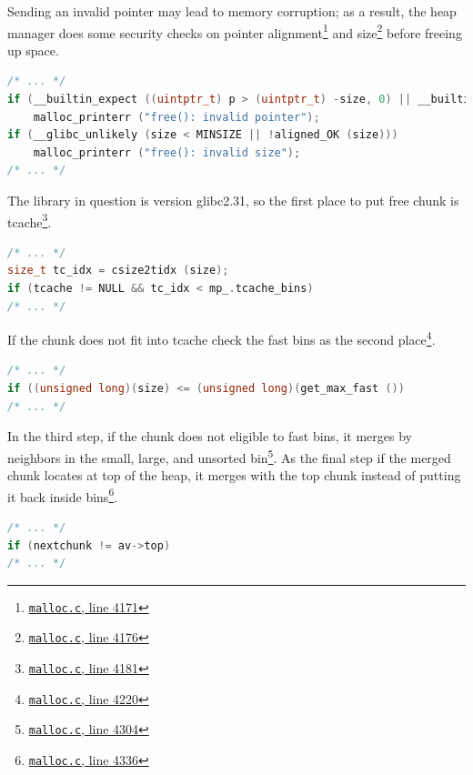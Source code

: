 \documentclass{masterthesis}
\newcommand*\libc{glibc}
\newcommand*\tch{tcache}
\newcommand*\fb{fast bins}
\begin{document}
Sending an invalid pointer may lead to memory corruption; as a result, the heap manager does some security checks on pointer alignment\footnote{\href{https://sourceware.org/git/?p=glibc.git;a=blob;f=malloc/malloc.c;h=f7cd29bc2f93e1082ee77800bd64a4b2a2897055;hb=9ea3686266dca3f004ba874745a4087a89682617\#l4171}{\texttt{malloc.c}, line 4171}} and size\footnote{\href{https://sourceware.org/git/?p=glibc.git;a=blob;f=malloc/malloc.c;h=f7cd29bc2f93e1082ee77800bd64a4b2a2897055;hb=9ea3686266dca3f004ba874745a4087a89682617\#l4176}{\texttt{malloc.c}, line 4176}} before freeing up space.

\begin{lstlisting}[language=c,frame=single]
 /* ... */
if (__builtin_expect ((uintptr_t) p > (uintptr_t) -size, 0) || __builtin_expect (misaligned_chunk (p), 0))
	malloc_printerr ("free(): invalid pointer");
if (__glibc_unlikely (size < MINSIZE || !aligned_OK (size)))
	malloc_printerr ("free(): invalid size");
/* ... */
\end{lstlisting}

The library in question is version \libc{2.31}, so the first place to put free chunk is \tch{}\footnote{\href{https://sourceware.org/git/?p=glibc.git;a=blob;f=malloc/malloc.c;h=f7cd29bc2f93e1082ee77800bd64a4b2a2897055;hb=9ea3686266dca3f004ba874745a4087a89682617\#l4181}{\texttt{malloc.c}, line 4181}}. 
\begin{lstlisting}[language=c,frame=single]
/* ... */
size_t tc_idx = csize2tidx (size);
if (tcache != NULL && tc_idx < mp_.tcache_bins)
/* ... */
\end{lstlisting}

If the chunk does not fit into \tch{} check the \fb{} as the second place\footnote{\href{https://sourceware.org/git/?p=glibc.git;a=blob;f=malloc/malloc.c;h=f7cd29bc2f93e1082ee77800bd64a4b2a2897055;hb=9ea3686266dca3f004ba874745a4087a89682617\#l4220}{\texttt{malloc.c}, line 4220}}. 

\begin{lstlisting}[language=c,frame=single]
/* ... */
if ((unsigned long)(size) <= (unsigned long)(get_max_fast ())
/* ... */
\end{lstlisting}

In the third step, if the chunk does not eligible to \fb{}, it merges by neighbors in the small, large, and unsorted bin\footnote{\href{https://sourceware.org/git/?p=glibc.git;a=blob;f=malloc/malloc.c;h=f7cd29bc2f93e1082ee77800bd64a4b2a2897055;hb=9ea3686266dca3f004ba874745a4087a89682617\#l4304}{\texttt{malloc.c}, line 4304}}. As the final step if the merged chunk locates at top of the heap, it merges with the top chunk instead of putting it back inside bins\footnote{\href{https://sourceware.org/git/?p=glibc.git;a=blob;f=malloc/malloc.c;h=f7cd29bc2f93e1082ee77800bd64a4b2a2897055;hb=9ea3686266dca3f004ba874745a4087a89682617\#l4336}{\texttt{malloc.c}, line 4336}}. 
\begin{lstlisting}[language=c,frame=single]
/* ... */
if (nextchunk != av->top)
/* ... */
\end{lstlisting}
\end{document}
